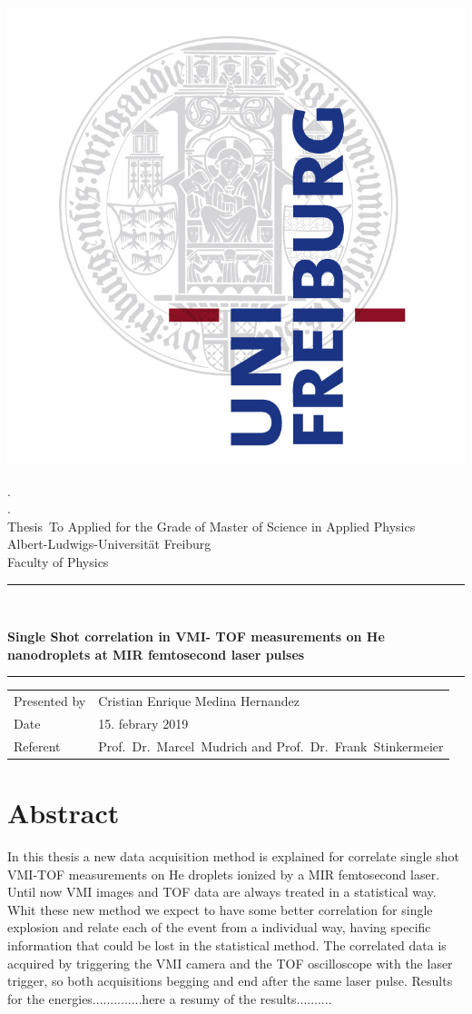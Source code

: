 \documentclass[a4paper,12pt,bibtotocnumbered, twosite]{scrreprt}
\newcommand{\titel}{Single Shot correlation in VMI- TOF measurements on He  nanodroplets at MIR femtosecond laser pulses}
\newcommand{\welchethesis}{To Applied for the Grade of Master of Science in Applied Physics}
\newcommand{\thesisofwas}{Thesis}
\newcommand{\welchesInstitute}{Faculty of Physics}
\newcommand{\welcheUni}{Albert-Ludwigs-Universität Freiburg}
\newcommand{\autor}{Cristian Enrique Medina Hernandez}
\newcommand{\datee}{15. febrary 2019} %
\newcommand{\referent}{ Prof.\ Dr.\ Marcel\ Mudrich and Prof.\ Dr.\ Frank\ Stinkermeier  }
\begin{document}
\begin{titlepage}
\centering
\includegraphics[width=7 cm]{logo}

\begin{center}    
    {\LARGE .} \\[0.5cm]
    {\large .} \\[5mm]
    {\large  \thesisofwas\ \welchethesis} \\ \welcheUni \\ \welchesInstitute  \\[5mm]
    \rule{\textwidth}{2pt}\\[0.5cm] 
    {\begin{spacing}{1.15} \huge \bfseries \titel \\
    \end{spacing}}
    \rule{\textwidth}{2pt}    
    \vfill 
 
     



    \begin{tabular}{ll} 
      Presented by & \autor \\
      Date & \datee \\
      Referent & \referent \\
    \end{tabular}  

\end{center}
    
\end{titlepage}


\chapter*{Abstract}

In this thesis a new data acquisition method is explained  for correlate single shot VMI-TOF measurements on He droplets ionized by a MIR femtosecond laser.  Until now VMI images and TOF data are always treated in a statistical way. Whit these new method we expect to have some better correlation for single explosion and relate each of the event from a  individual way, having specific information that could be lost in the statistical method.
The correlated data is acquired by triggering the VMI camera and the TOF oscilloscope with the laser trigger, so both acquisitions begging and end after the same laser pulse. Results for the energies..............here a resumy of the results..........
\end{document}
